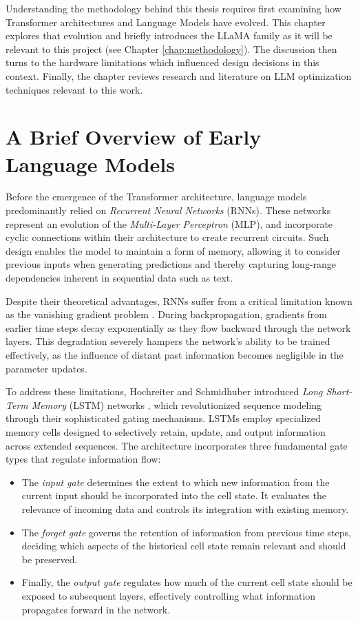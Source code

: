 Understanding the methodology behind this thesis requires first examining how Transformer architectures and Language Models have evolved. This chapter explores that evolution and briefly introduces the LLaMA family as it will be relevant to this project (see Chapter \ref{chap:methodology}). The discussion then turns to the hardware limitations which influenced design decisions in this context. Finally, the chapter reviews research and literature on LLM optimization techniques relevant to this work.

\section{A Brief Overview of Early Language Models}
Before the emergence of the Transformer architecture, language models predominantly relied on \textit{Recurrent Neural Networks} (RNNs). These networks represent an evolution of the \textit{Multi-Layer Perceptron} (MLP), and incorporate cyclic connections within their architecture to create recurrent circuits. Such design enables the model to maintain a form of memory, allowing it to consider previous inputs when generating predictions and thereby capturing long-range dependencies inherent in sequential data such as text.

Despite their theoretical advantages, RNNs suffer from a critical limitation known as the vanishing gradient problem \cite{rnn}. During backpropagation, gradients from earlier time steps decay exponentially as they flow backward through the network layers. This degradation severely hampers the network's ability to be trained effectively, as the influence of distant past information becomes negligible in the parameter updates.

To address these limitations, Hochreiter and Schmidhuber introduced \textit{Long Short-Term Memory} (LSTM) networks \cite{lstm} \cite{hinton-lstm}, which revolutionized sequence modeling through their sophisticated gating mechanisms. LSTMs employ specialized memory cells designed to selectively retain, update, and output information across extended sequences.  The architecture incorporates three fundamental gate types that regulate information flow:
\begin{itemize}
    \item The \textit{input gate} determines the extent to which new information from the current input should be incorporated into the cell state. It evaluates the relevance of incoming data and controls its integration with existing memory.
    \item The \textit{forget gate} governs the retention of information from previous time steps, deciding which aspects of the historical cell state remain relevant and should be preserved.
    \item Finally, the \textit{output gate} regulates how much of the current cell state should be exposed to subsequent layers, effectively controlling what information propagates forward in the network.
\end{itemize}

